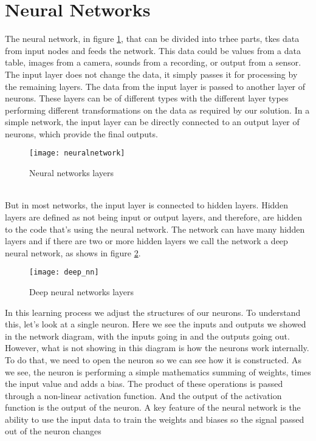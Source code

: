 \section{Neural Networks}
\label{sec:neuralnetwork}
%
The neural network, in figure \ref{fig:nn_layer}, that can be divided into trhee
parts, tkes data from input nodes and feeds the network.
This data could be values from a data table, images from a camera, sounds from a
recording, or output from a sensor.
The input layer does not change the data, it simply passes it for processing by
the remaining layers. The data from the input layer is passed to another layer
of neurons.
These layers can be of different types with the different layer types performing
different transformations on the data as required by our solution. In a simple
network, the input layer can be directly connected to an output layer of neurons,
which provide the final outputs.\linebreak
%
\begin{figure}[!h]
\centering
\texttt{[image: neuralnetwork]}
\caption{Neural networks layers}
\label{fig:nn_layer}
\end{figure}
%
\\But in most networks, the input layer is connected to hidden layers.
Hidden layers are defined as not being input or output layers, and therefore,
are hidden to the code that's using the neural network.
The network can have many hidden layers and if there are two or more hidden
layers we call the network a deep neural network, as shows in figure 
\ref{fig:deepnn}.
%
\begin{figure}[!h]
\centering
\texttt{[image: deep\_nn]}
\caption{Deep neural networks layers}
\label{fig:deepnn}
\end{figure}
%
In this learning process we adjust the structures of our neurons.
To understand this, let's look at a single neuron. Here we see the inputs and
outputs we showed in the network diagram, with the inputs going in and the
outputs going out.
However, what is not showing in this diagram is how the neurons work internally.
To do that, we need to open the neuron so we can see how it is constructed.
As we see, the neuron is performing a simple mathematics summing of weights, 
times the input value and adds a bias.
The product of these operations is passed through a non-linear activation
function.
And the output of the activation function is the output of the neuron.
A key feature of the neural network is the ability to use the input data to
train the weights and biases so the signal passed out of the neuron changes
